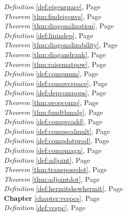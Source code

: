\begin{multicols}{3}
\begin{center}
      \textit{Definition} \ref{def:eigenspace}, Page \pageref{def:eigenspace} \\
      \textit{Theorem} \ref{thm:findeigenvs}, Page \pageref{thm:findeigenvs} \\
      \textit{Theorem} \ref{thm:diagonalization}, Page \pageref{thm:diagonalization} \\
      \textit{Definition} \ref{def:linindep}, Page \pageref{def:linindep} \\
      \textit{Theorem} \ref{thm:diagonalizability}, Page \pageref{thm:diagonalizability} \\
      \textit{Theorem} \ref{thm:diagandrank}, Page \pageref{thm:diagandrank} \\
      \textit{Theorem} \ref{thm:raisematpow}, Page \pageref{thm:raisematpow} \\
      \textit{Definition} \ref{def:compnum}, Page \pageref{def:compnum} \\
      \textit{Definition} \ref{def:compvcspace}, Page \pageref{def:compvcspace} \\
      \textit{Definition} \ref{def:depcompops}, Page \pageref{def:depcompops} \\
      \textit{Theorem} \ref{thm:propcomp}, Page \pageref{thm:propcomp} \\
      \textit{Theorem} \ref{thm:fundthmalg}, Page \pageref{thm:fundthmalg} \\
      \textit{Definition} \ref{def:compvcadd}, Page \pageref{def:compvcadd} \\
      \textit{Definition} \ref{def:compscalmult}, Page \pageref{def:compscalmult} \\
      \textit{Definition} \ref{def:compdotprod}, Page \pageref{def:compdotprod} \\
      \textit{Definition} \ref{def:compmagn}, Page \pageref{def:compmagn} \\
      \textit{Definition} \ref{def:adjoint}, Page \pageref{def:adjoint} \\
      \textit{Theorem} \ref{thm:transposedot}, Page \pageref{thm:transposedot} \\
      \textit{Theorem} \ref{thm:adjointdot}, Page \pageref{thm:adjointdot} \\
      \textit{Definition} \ref{def:hermitskewhermit}, Page \pageref{def:hermitskewhermit} \\
      \textbf{Chapter} \ref{chapter:vcspcs}, Page \pageref{chapter:vcspcs} \\
      \textit{Definition} \ref{def:vcspc}, Page \pageref{def:vcspc} \\

\end{center}
\end{multicols}
